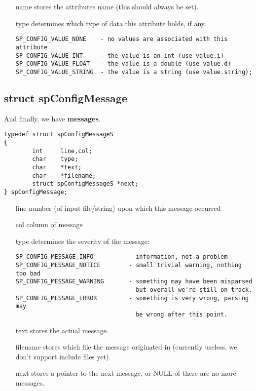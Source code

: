 \documentclass[10pt]{article}
\begin{document}
\begin{itemize}
	\item[name] stores the attributes name (this should always be set).
	\item[type] determines which type of data this attribute holds, if any.\\
\begin{verbatim}SP_CONFIG_VALUE_NONE    - no values are associated with this attribute
SP_CONFIG_VALUE_INT     - the value is an int (use value.i)
SP_CONFIG_VALUE_FLOAT   - the value is a double (use value.d)
SP_CONFIG_VALUE_STRING  - the value is a string (use value.string);\end{verbatim}
\end{itemize}


\subsection{struct spConfigMessage}

\noindent And finally, we have \textbf{messages}.\\
\begin{verbatim}
typedef struct spConfigMessageS
{
        int     line,col;
        char    type;
        char    *text;
        char    *filename;
        struct spConfigMessageS *next;
} spConfigMessage;
\end{verbatim}

\begin{itemize}
	\item[line] number (of input file/string) upon which this message occurred
	\item[col] column of message
	\item[type] determines the severity of the message:\\
\begin{verbatim}
SP_CONFIG_MESSAGE_INFO          - information, not a problem
SP_CONFIG_MESSAGE_NOTICE        - small trivial warning, nothing too bad
SP_CONFIG_MESSAGE_WARNING       - something may have been misparsed
                                  but overall we're still on track.
SP_CONFIG_MESSAGE_ERROR         - something is very wrong, parsing may 
                                  be wrong after this point.
\end{verbatim}

	\item[text] stores the actual message.
	\item[filename] stores which file the message
originated in (currently useless, we don't support include files yet).
	\item[next] stores a pointer to the next message, or NULL of there
are no more messages.
\end{itemize}
\end{document}
